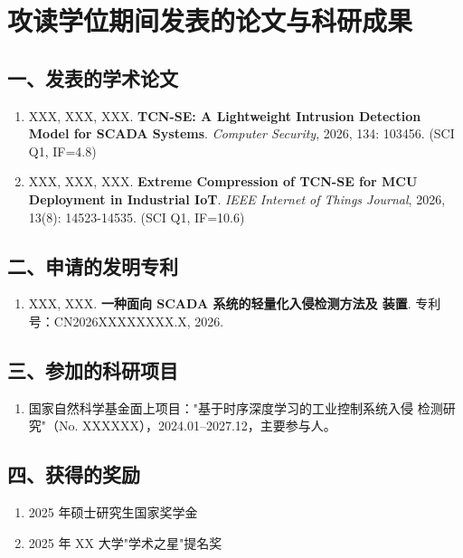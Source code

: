 
\chapter*{攻读学位期间发表的论文与科研成果}

\thispagestyle{fancy}

\section*{一、发表的学术论文}
\begin{enumerate}
  \item XXX, XXX, XXX. \textbf{TCN-SE: A Lightweight Intrusion Detection
        Model for SCADA Systems}\cite{ref:my_paper1}. \textit{Computer
        Security}, 2026, 134: 103456. (SCI Q1, IF=4.8)
  \item XXX, XXX, XXX. \textbf{Extreme Compression of TCN-SE for MCU
        Deployment in Industrial IoT}\cite{ref:my_paper2}. \textit{IEEE
        Internet of Things Journal}, 2026, 13(8): 14523-14535. (SCI Q1,
        IF=10.6)
\end{enumerate}

\section*{二、申请的发明专利}
\begin{enumerate}
  \item XXX, XXX. \textbf{一种面向 SCADA 系统的轻量化入侵检测方法及
        装置}\cite{ref:my_patent1}. 专利号：CN2026XXXXXXXX.X, 2026.
\end{enumerate}

\section*{三、参加的科研项目}
\begin{enumerate}
  \item 国家自然科学基金面上项目："基于时序深度学习的工业控制系统入侵
        检测研究"（No. XXXXXX），2024.01--2027.12，主要参与人。
\end{enumerate}

\section*{四、获得的奖励}
\begin{enumerate}
  \item 2025 年硕士研究生国家奖学金
  \item 2025 年 XX 大学"学术之星"提名奖
\end{enumerate}

